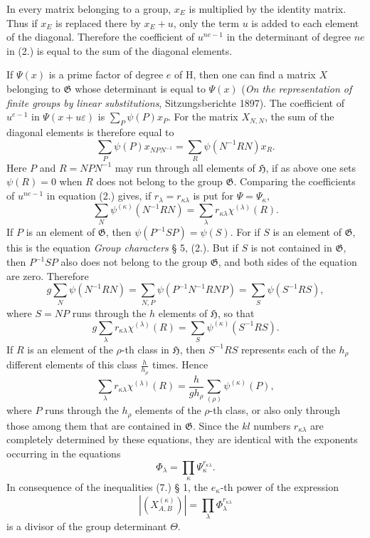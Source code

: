 \documentclass[11pt]{article}
\newcommand{\Hgr}{\mathfrak{H}}
\newcommand{\Ggr}{\mathfrak{G}}
\begin{document}
In every matrix belonging to a group, $x_E$ is multiplied by the identity matrix. Thus if $x_E$ is replaced there by $x_E+u$, only the term $u$ is added to each element of the diagonal. Therefore the coefficient of $u^{ne-1}$ in the determinant of degree $ne$ in (2.) is equal to the sum of the diagonal elements.

If $\Psi(x)$ is a prime factor of degree $e$ of $\mathrm H$, then one can find a matrix $X$ belonging to $\Ggr$ whose determinant is equal to $\Psi(x)$ (\emph{On the representation of finite groups by linear substitutions}, Sitzungsberichte 1897). The coefficient of $u^{e-1}$ in $\Psi(x+u\varepsilon)$ is $\sum_P\psi(P)x_P$. For the matrix $X_{N,N}$, the sum of the diagonal elements is therefore equal to
\[
  \sum_P\psi(P)x_{NPN^{-1}}
  =
  \sum_R\psi(N^{-1}RN)x_R.
\]
Here $P$ and $R=NPN^{-1}$ may run through all elements of $\Hgr$, if as above one sets $\psi(R)=0$ when $R$ does not belong to the group $\Ggr$. Comparing the coefficients of $u^{ne-1}$ in equation (2.) gives, if $r_\lambda=r_{\kappa\lambda}$ is put for $\Psi=\Psi_\kappa$,
\[
\tag{3.}
  \sum_N\psi^{(\kappa)}(N^{-1}RN)
  =
  \sum_\lambda r_{\kappa\lambda}\chi^{(\lambda)}(R).
\]
If $P$ is an element of $\Ggr$, then $\psi(P^{-1}SP)=\psi(S)$. For if $S$ is an element of $\Ggr$, this is the equation \emph{Group characters} § 5, (2.). But if $S$ is not contained in $\Ggr$, then $P^{-1}SP$ also does not belong to the group $\Ggr$, and both sides of the equation are zero. Therefore
\[
  g\sum_N\psi(N^{-1}RN)
  =
  \sum_{N,P}\psi(P^{-1}N^{-1}RNP)
  =
  \sum_S\psi(S^{-1}RS),
\]
where $S=NP$ runs through the $h$ elements of $\Hgr$, so that
\[
\tag{4.}
  g\sum_\lambda r_{\kappa\lambda}\chi^{(\lambda)}(R)
  =
  \sum_S\psi^{(\kappa)}(S^{-1}RS).
\]
If $R$ is an element of the $\rho$-th class in $\Hgr$, then $S^{-1}RS$ represents each of the $h_\rho$ different elements of this class $\frac{h}{h_\rho}$ times. Hence
\[
\tag{5.}
  \sum_\lambda r_{\kappa\lambda}\chi^{(\lambda)}(R)
  =
  \frac{h}{g h_\rho}\sum_{(\rho)}\psi^{(\kappa)}(P),
\]
where $P$ runs through the $h_\rho$ elements of the $\rho$-th class, or also only through those among them that are contained in $\Ggr$. Since the $kl$ numbers $r_{\kappa\lambda}$ are completely determined by these equations, they are identical with the exponents occurring in the equations
\[
\tag{6.}
  \Phi_\lambda=\prod_\kappa\Psi_\kappa^{r_{\kappa\lambda}}.
\]
In consequence of the inequalities (7.) § 1, the $e_\kappa$-th power of the expression
\[
\tag{7.}
  |(X^{(\kappa)}_{A,B})|=\prod_\lambda\Phi_\lambda^{r_{\kappa\lambda}}
\]
is a divisor of the group determinant $\Theta$.
\end{document}
